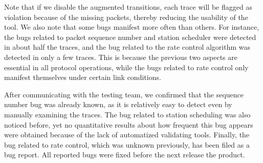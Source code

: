 Note that if we disable
the augmented transitions, each trace will be flagged as violation because of
the missing packets, thereby reducing the usability of the tool. We also note
that some bugs manifest more often than others. For instance, the bugs related
to packet sequence number and station scheduler were detected in about half the
traces, and the bug related to the rate control algorithm was detected in only a
few traces. This is because the previous two aspects are essential in all
protocol operations, while the bugs related to rate control only manifest
themselves under certain link conditions.

After communicating with the testing team, we confirmed that the sequence number
bug was already known, as it is relatively easy to detect even by manually
examining the traces. The bug related to station scheduling was also noticed
before, yet no quantitative results about how frequent this bug appears were
obtained because of the lack of automatized validating tools. Finally, the bug
related to rate control, which was unknown previously, has been filed as a bug
report. All reported bugs were fixed before the next release the product.
